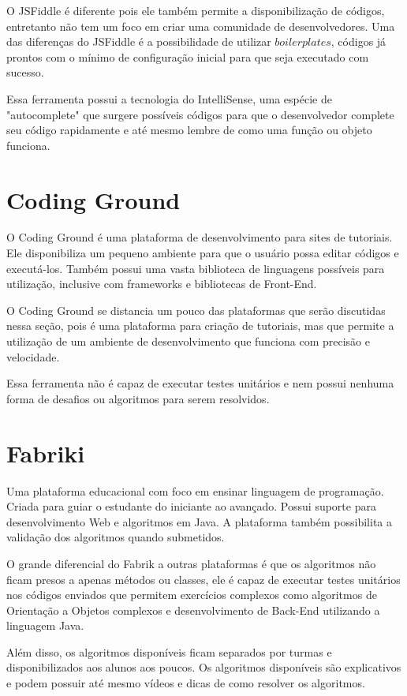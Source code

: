 O JSFiddle é diferente pois ele também permite a disponibilização de códigos, entretanto não tem um foco em criar uma comunidade de desenvolvedores. Uma das diferenças do JSFiddle é a possibilidade de utilizar $boilerplates$, códigos já prontos com o mínimo de configuração inicial para que seja executado com sucesso.

Essa ferramenta possui a tecnologia do IntelliSense, uma espécie de "autocomplete" que surgere possíveis códigos para que o desenvolvedor complete seu código rapidamente e até mesmo lembre de como uma função ou objeto funciona.

\section{Coding Ground}
\label{sec:codingground}
O Coding Ground é uma plataforma de desenvolvimento para sites de tutoriais. Ele disponibiliza um pequeno ambiente para que o usuário possa editar códigos e executá-los. Também possui uma vasta biblioteca de linguagens possíveis para utilização, inclusive com frameworks e bibliotecas de Front-End.

O Coding Ground se distancia um pouco das plataformas que serão discutidas nessa seção, pois é uma plataforma para criação de tutoriais, mas que permite a utilização de um ambiente de desenvolvimento que funciona com precisão e velocidade.

Essa ferramenta não é capaz de executar testes unitários e nem possui nenhuma forma de desafios ou algoritmos para serem resolvidos.

\section{Fabriki}
\label{sec:fabriki}
Uma plataforma educacional com foco em ensinar linguagem de programação. Criada para guiar o estudante do iniciante ao avançado. Possui suporte para desenvolvimento Web e algoritmos em Java. A plataforma também possibilita a validação dos algoritmos quando submetidos.

O grande diferencial do Fabrik a outras plataformas é que os algoritmos não ficam presos a apenas métodos ou classes, ele é capaz de executar testes unitários nos códigos enviados que permitem exercícios complexos como algoritmos de Orientação a Objetos complexos e desenvolvimento de Back-End utilizando a linguagem Java.

Além disso, os algoritmos disponíveis ficam separados por turmas e disponibilizados aos alunos aos poucos. Os algoritmos disponíveis são explicativos e podem possuir até mesmo vídeos e dicas de como resolver os algoritmos.

